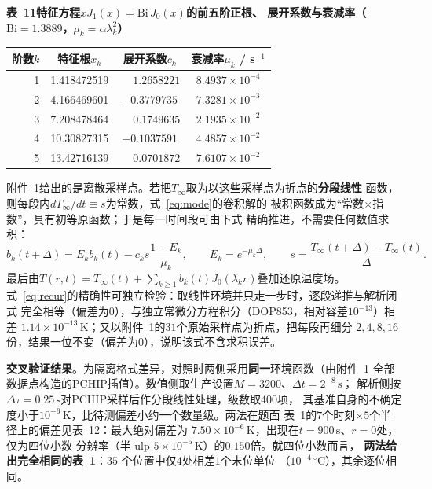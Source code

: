 \documentclass[withoutpreface,bwprint]{cumcmthesis} %
\begin{document}
\begin{appendices}
\begin{table}[htbp]
\centering
\begin{minipage}{\textwidth}
\centering
{\textbf{表~11\quad 特征方程$xJ_1(x)=\mathrm{Bi}\,J_0(x)$的前五阶正根、
展开系数与衰减率（$\mathrm{Bi}=1.3889$，$\mu_k=\alpha\lambda_k^2$）}}\\[6pt]
\renewcommand{\arraystretch}{1.38}%
\begin{tabular*}{\textwidth}{@{\extracolsep{\fill}}rccc@{}}
\toprule
阶数$k$ & 特征根$x_k$ & 展开系数$c_k$ & 衰减率$\mu_k$ / s$^{-1}$ \\
\midrule
1 & 1.418472519 & $\phantom{-}1.2658221$ & $8.4937\times10^{-4}$ \\
2 & 4.166469601 & $-0.3779735$ & $7.3281\times10^{-3}$ \\
3 & 7.208478464 & $\phantom{-}0.1749635$ & $2.1935\times10^{-2}$ \\
4 & 10.30827315 & $-0.1037591$ & $4.4857\times10^{-2}$ \\
5 & 13.42716139 & $\phantom{-}0.0701872$ & $7.6107\times10^{-2}$ \\
\bottomrule
\end{tabular*}
\end{minipage}
\end{table}

附件~1给出的是离散采样点。若把$T_\infty$取为以这些采样点为折点的\textbf{分段线性}
函数，则每段内$dT_\infty/dt\equiv s$为常数，式~\eqref{eq:mode}的卷积解的
被积函数成为``常数$\times$指数''，具有初等原函数；于是每一时间段可由下式
精确推进，不需要任何数值求积：
\begin{equation}
\label{eq:recur}
b_k(t+\Delta)=E_kb_k(t)-c_ks\frac{1-E_k}{\mu_k},\qquad
E_k=e^{-\mu_k\Delta},\qquad
s=\frac{T_\infty(t+\Delta)-T_\infty(t)}{\Delta}.
\end{equation}
最后由$T(r,t)=T_\infty(t)+\sum_{k\ge1}b_k(t)J_0(\lambda_kr)$叠加还原温度场。
式~\eqref{eq:recur}的精确性可独立检验：取线性环境并只走一步时，逐段递推与解析闭式
完全相等（偏差为$0$），与独立常微分方程积分（DOP853，相对容差$10^{-13}$）相差
$1.14\times10^{-13}\,\mathrm{K}$；又以附件~1的$31$个原始采样点为折点，把每段再细分
$2,4,8,16$份，结果一位不变（偏差为$0$），说明该式不含求积误差。

\textbf{交叉验证结果}。为隔离格式差异，对照时两侧采用\textbf{同一}环境函数（由附件~1
全部数据点构造的PCHIP插值）。数值侧取生产设置$M=3200$、$\Delta t=2^{-8}\,\mathrm{s}$；
解析侧按$\Delta\tau=0.25\,\mathrm{s}$对PCHIP采样后作分段线性处理，级数取$400$项，
其基准自身的不确定度小于$10^{-6}\,\mathrm{K}$，比待测偏差小约一个数量级。两法在题面
表~1的$7$个时刻$\times5$个半径上的偏差见表~12：最大绝对偏差为
$7.50\times10^{-6}\,\mathrm{K}$，出现在$t=900\,\mathrm{s}$、$r=0$处，仅为四位小数
分辨率（半 ulp $5\times10^{-5}\,\mathrm{K}$）的$0.150$倍。就四位小数而言，
\textbf{两法给出完全相同的表~1}：$35$ 个位置中仅$4$处相差$1$个末位单位
（$10^{-4}\,^\circ\mathrm{C}$），其余逐位相同。


\end{appendices}
\end{document}
